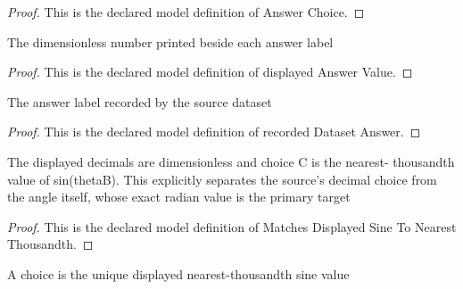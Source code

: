 \begin{proof}
  This is the declared model definition of Answer Choice.
\end{proof}
\begin{definition}
  \label{def:physics:phyx-mini-0138:phyxminiproblems-problemphyxmini0138-displayedanswervalue}
  The dimensionless number printed beside each answer label
\end{definition}
\begin{proof}
  This is the declared model definition of displayed Answer Value.
\end{proof}
\begin{definition}
  \label{def:physics:phyx-mini-0138:phyxminiproblems-problemphyxmini0138-recordeddatasetanswer}
  The answer label recorded by the source dataset
\end{definition}
\begin{proof}
  This is the declared model definition of recorded Dataset Answer.
\end{proof}
\begin{definition}
  \label{def:physics:phyx-mini-0138:phyxminiproblems-problemphyxmini0138-matchesdisplayedsinetonearestthousandth}
  The displayed decimals are dimensionless and choice C is the nearest- thousandth value of sin(thetaB). This explicitly separates the source's decimal choice from the angle itself, whose exact radian value is the primary target
\end{definition}
\begin{proof}
  This is the declared model definition of Matches Displayed Sine To Nearest Thousandth.
\end{proof}
\begin{definition}
  \label{def:physics:phyx-mini-0138:phyxminiproblems-problemphyxmini0138-isuniquematchingdisplayedsine}
  A choice is the unique displayed nearest-thousandth sine value
\end{definition}
